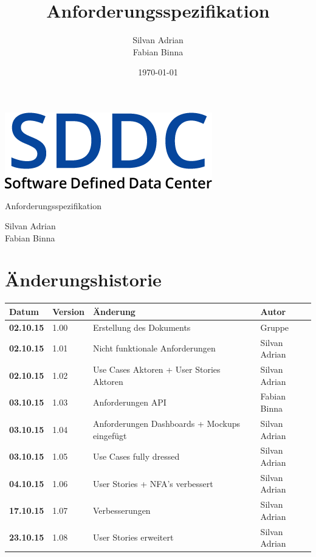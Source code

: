 \documentclass[11pt]{scrartcl}
\title{Anforderungsspezifikation}
\author{Silvan Adrian \\ Fabian Binna}
\date{\today{}}
\begin{document}
\def\arraystretch{1.5}
\begin{titlepage}
\begin{center}
\vspace{10em}
\includegraphics[scale=2]{SDDC}
\vspace{10em}
\end{center}
\begin{center}
\huge {Anforderungsspezifikation}
\end{center}
\begin{center}
\vspace{10em}
\LARGE {Silvan Adrian} \\
\LARGE {Fabian Binna}
\end{center}

\end{titlepage}

\newpage
\section{Änderungshistorie}
\begin{tabularx}{\linewidth}{l l X l}
\textbf{Datum} & \textbf{Version} & \textbf{Änderung}  & \textbf{Autor} \\
\hline
\textbf{02.10.15} & 1.00 & Erstellung des Dokuments & Gruppe \\
\textbf{02.10.15} & 1.01 & Nicht funktionale Anforderungen & Silvan Adrian\\
\textbf{02.10.15} & 1.02 & Use Cases Aktoren + User Stories Aktoren & Silvan 
Adrian\\
\textbf{03.10.15} & 1.03 & Anforderungen API & Fabian Binna\\
\textbf{03.10.15} & 1.04 & Anforderungen Dashboards + Mockups eingefügt & Silvan 
Adrian\\
\textbf{03.10.15} & 1.05 & Use Cases fully dressed & Silvan Adrian\\
\textbf{04.10.15} & 1.06 & User Stories + NFA's verbessert & Silvan Adrian\\
\textbf{17.10.15} & 1.07 & Verbesserungen & Silvan Adrian\\
\textbf{23.10.15} & 1.08 & User Stories erweitert & Silvan Adrian\\
\end{tabularx}
\end{document}
